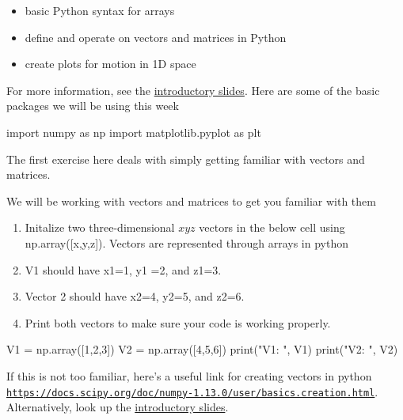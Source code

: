 \documentclass[%
oneside,                 %
final,                   %
10pt]{article}
\begin{document}
\begin{itemize}
\item basic Python syntax for arrays

\item define and operate on vectors and matrices in Python

\item create plots for motion in 1D space
\end{itemize}

\noindent
For more information, see the \href{{https://mhjensen.github.io/Physics321/doc/pub/week2/html/week2.html}}{introductory slides}.
Here are some of the basic packages we will be using this week




\bpycod
import numpy as np 
import matplotlib.pyplot as plt

\epycod


The first exercise here deals with simply getting familiar with vectors and matrices.

We will be working with vectors and matrices to get you familiar with them

\begin{enumerate}
\item Initalize two three-dimensional $xyz$ vectors in the below cell using np.array([x,y,z]). Vectors are represented through arrays in python

\item V1 should have x1=1, y1 =2, and z1=3. 

\item Vector 2 should have x2=4, y2=5,  and z2=6. 

\item Print both vectors to make sure your code is working properly.
\end{enumerate}

\noindent





\bpycod
V1 = np.array([1,2,3])
V2 = np.array([4,5,6])
print("V1: ", V1)
print("V2: ", V2)

\epycod


If this is not too familiar, here's a useful link for creating vectors in python
\href{{https://docs.scipy.org/doc/numpy-1.13.0/user/basics.creation.html}}{\nolinkurl{https://docs.scipy.org/doc/numpy-1.13.0/user/basics.creation.html}}. Alternatively, look up the \href{{https://mhjensen.github.io/Physics321/doc/pub/week2/html/week2.html}}{introductory slides}.
\end{document}
